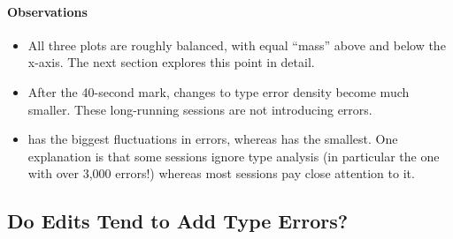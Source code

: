 \documentclass[english,submission,cleveref]{programming}
\begin{document}
\paragraph{Observations}


\begin{itemize}
  \item
    All three plots are roughly balanced,
    with equal ``mass'' above and below the x-axis.
    The next section explores this point in detail.

  \item
    After the 40-second mark, changes to type error density become much
    smaller.
    These long-running sessions are not introducing errors.

  \item
    \mnonstrict{} has the biggest fluctuations in errors, whereas \mstrict{}
    has the smallest.
    One explanation is that some \mnonstrict{} sessions ignore type analysis
    (in particular the one with over 3,000 errors!) whereas most \mstrict{}
    sessions pay close attention to it.


\end{itemize}


\subsection{Do Edits Tend to Add Type Errors?}
\label{s:tefs-compass}
\label{s:strict-vs-forcedstrict}
\end{document}

